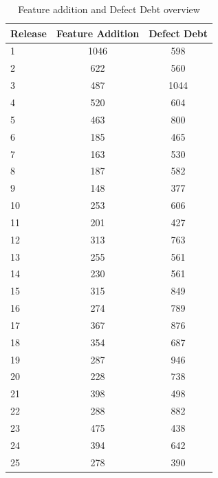
\begin{table}[!hbt]
      \begin{center}
            \caption{Feature addition and Defect Debt overview}
            \label{tab:feature_addition_badsmell_overview}
            \begin{tabular}{l| c c }
            \toprule
            \textbf{Release}  & \textbf{Feature Addition} & \textbf{Defect Debt} \\ \midrule 
              1  & 1046 & 598   \\ 
              2  & 622 & 560    \\ 
              3  & 487 & 1044   \\ 
              4  & 520 & 604    \\ 
              5  & 463 & 800    \\ 
              6  & 185 & 465    \\ 
              7  & 163 & 530    \\ 
              8  & 187 & 582    \\ 
              9  & 148 & 377    \\ 
             10  & 253 & 606    \\ 
             11  & 201 & 427    \\ 
             12  & 313 & 763    \\ 
             13  & 255 & 561    \\ 
             14  & 230 & 561    \\ 
             15  & 315 & 849    \\ 
             16  & 274 & 789    \\ 
             17  & 367 & 876    \\ 
             18  & 354 & 687    \\ 
             19  & 287 & 946    \\ 
             20  & 228 & 738    \\ 
             21  & 398 & 498    \\ 
             22  & 288 & 882    \\ 
             23  & 475 & 438    \\ 
             24  & 394 & 642    \\ 
             25  & 278 & 390    \\ \bottomrule
            \end{tabular}
      \end{center}
\end{table}

